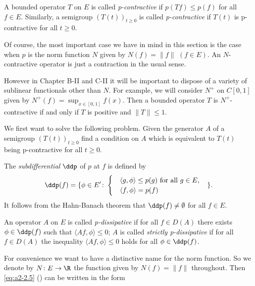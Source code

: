 A bounded operator $T$ on $E$ is called \emph{p-contractive} if $p(Tf) \leq p(f)$ for all $f \in E$.
Similarly, a semigroup $(T(t))_{t\geq 0}$ is called \emph{p-contractive} if $T(t)$ is p-contractive for all $t \geq 0$.

Of course, the most important case we have in mind in this section is the case when $p$ is the norm function $N$ given by $N(f) = \|f\|$ $(f \in E)$.
An $N$-contractive operator is just a contraction in the usual sense.\\
\begin{remark*} \label{rem:a2-2.1-kgk}
However in Chapter B-II and C-II it will be important to dispose of a variety of sublinear functionals other than $N$.
For example, we will consider $N^{+}$ on $C[0,1]$ given by $N^{+}(f) = \sup_{x \in [0,1]} f(x)$.
Then a bounded operator $T$ is $N^{+}$-contractive if and only if $T$ is positive and $\|T\| \leq 1$.
\end{remark*}

We first want to solve the following problem.
Given the generator $A$ of a semigroup $(T(t))_{t\geq 0}$ find a condition on $A$ which is equivalent to $T(t)$ being p-contractive for all $t \geq 0$.

The \emph{subdifferential} $\ddp$ of $p$ at $f$ is defined by
\begin{equation}\label{eq:a2-2.5}
\ddp(f) = \{\phi \in E' \colon \begin{cases} &\langle g,\phi \rangle \leq p(g) \text{ for all } g \in E, \\
&\langle f,\phi \rangle = p(f)
\end{cases} \quad \}.
\end{equation}
It follows from the Hahn-Banach theorem that $\ddp(f) \neq \emptyset$ for all $f \in E$.

\begin{definition}\label{def:a2-2.1}
An operator $A$ on $E$ is called \emph{p-dissipative} if for all $f \in D(A)$ there exists $\phi \in \ddp(f)$ such that $\langle Af,\phi \rangle \leq 0$;
$A$ is called \emph{strictly p-dissipative} if for all $f \in D(A)$ the inequality $\langle Af,\phi \rangle \leq 0$ holds for all $\phi \in \ddp(f)$.
\end{definition}
For convenience we want to have a distinctive name for the norm function.
So we denote by $N \colon E \to \R$ the function given by $N(f) = \|f\|$ throughout.
Then \eqref{eq:a2-2.5} () can be written in the form

